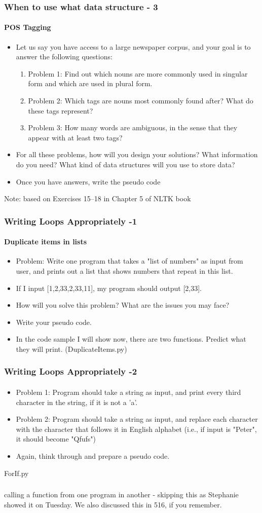 \documentclass{beamer}
\begin{document}
\begin{frame}
\frametitle{When to use what data structure - 3}
\framesubtitle{POS Tagging}
\begin{itemize}
\item Let us say you have access to a large newspaper corpus, and your goal is to answer the following questions:
\begin{enumerate}
\item Problem 1: Find out which nouns are more commonly used in singular form and which are used in plural form.
\item Problem 2: Which tags are nouns most commonly found after? What do these tags represent?
\item Problem 3: How many words are ambiguous, in the sense that they appear with at least two tags?
\end{enumerate}
\item For all these problems, how will you design your solutions? What information do you need? What kind of data structures will you use to store data? 
\item Once you have answers, write the pseudo code
\end{itemize}
Note: based on Exercises 15--18 in Chapter 5 of NLTK book
\end{frame}

\begin{frame}
\frametitle{Writing Loops Appropriately -1}
\framesubtitle{Duplicate items in lists}
\begin{itemize}
\item Problem: Write one program that takes a "list of numbers" as input from user, and prints out a list that shows numbers that repeat in this list. 
\item If I input [1,2,33,2,33,11], my program should output [2,33].
\item How will you solve this problem? What are the issues you may face? 
\item Write your pseudo code.\pause
\item In the code sample I will show now, there are two functions. Predict what they will print. (DuplicateItems.py)
\end{itemize}
\end{frame}

\begin{frame}
\frametitle{Writing Loops Appropriately -2}
\framesubtitle{}
\begin{itemize}
\item Problem 1: Program should take a string as input, and print every third character in the string, if it is not a 'a'. \pause
\item Problem 2:  Program should take a string as input, and replace each character with the character that follows it in English alphabet (i.e., if input is "Peter", it should become "Qfufs")
\item Again, think through and prepare a pseudo code. 
\end{itemize}
\pause ForIf.py
\end{frame}

\begin{frame}
\frametitle{}
calling a function from one program in another - skipping this as Stephanie showed it on Tuesday. We also discussed this in 516, if you remember. 
\end{frame}
\end{document}
